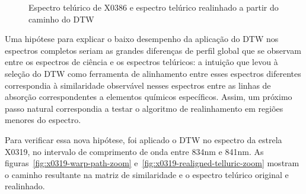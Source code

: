 \begin{figure}[H]
  \centering
  \hfill
  \caption{Espectro telúrico de X0386 e espectro telúrico realinhado a partir do caminho do DTW}
  \label{fig:x0386-realigned-telluric}
\end{figure}


Uma hipótese para explicar o baixo desempenho da aplicação do DTW nos espectros completos seriam as grandes diferenças de perfil global que se observam entre os espectros de ciência e os espectros telúricos: a intuição que levou à seleção do DTW como ferramenta de alinhamento entre esses espectros diferentes correspondia à similaridade observável nesses espectros entre as linhas de absorção correspondentes a elementos químicos específicos. Assim, um próximo passo natural correspondia a testar o algoritmo de realinhamento em regiões menores do espectro.

Para verificar essa nova hipótese, foi aplicado o DTW no espectro da estrela X0319, no intervalo de comprimento de onda entre 834nm e 841nm. As figuras~\ref{fig:x0319-warp-path-zoom} e~\ref{fig:x0319-realigned-telluric-zoom} mostram o caminho resultante na matriz de similaridade e o espectro telúrico original e realinhado. 

